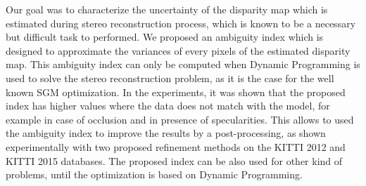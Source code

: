 \documentclass{article}
\begin{document}
Our goal was to characterize the uncertainty of the disparity map which is estimated during stereo reconstruction process, which is known to be a necessary but difficult task to performed. We proposed an ambiguity index which is designed to approximate the variances of every pixels of the estimated disparity map. This ambiguity index can only be computed when Dynamic Programming is used to solve the stereo reconstruction problem, as it is the case for the well known SGM optimization. In the experiments, it was shown that the proposed index has higher values where the data does not match with the model, for example in case of occlusion and in presence of specularities. This allows to used the ambiguity index to improve the results by a post-processing, as shown experimentally with two proposed refinement methods on the KITTI 2012 and KITTI 2015 databases.  The proposed index can be also used for other kind of problems, until the optimization is based on Dynamic Programming.



\end{document}
